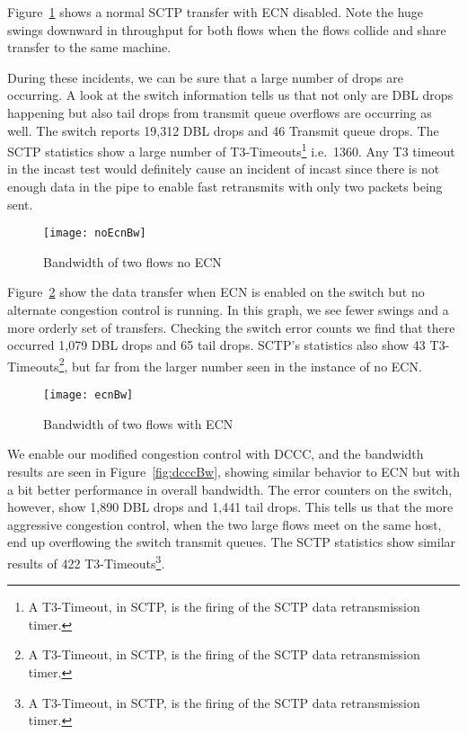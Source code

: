 \documentclass[12pt]{article}
\begin{document}
Figure~\ref{fig:noEcnBw} shows a normal SCTP transfer with
ECN disabled. Note the huge swings downward in throughput for both
flows when the flows collide and share transfer to the same machine. 

During these incidents, we can be sure that a large number of drops are occurring. A look at the switch
information tells us that not only are DBL drops happening but also tail
drops from transmit queue overflows are occurring as well.  The switch reports 19,312 DBL drops
and 46 Transmit queue drops. The SCTP statistics show
a large number of T3-Timeouts\footnote{A T3-Timeout, in SCTP, is the firing of the SCTP data retransmission timer.}
 i.e.~1360. Any T3 timeout in the incast test would definitely
cause an incident of incast since there is not enough data in the pipe to enable fast retransmits with
only two packets being sent.

\begin{figure}[!h]
\centering
\texttt{[image: noEcnBw]}
\caption{Bandwidth of two flows no ECN}
\label{fig:noEcnBw}
\end{figure}



Figure~\ref{fig:ecnBw} show the data transfer when ECN is enabled on
the switch but no alternate congestion control is running. In this graph,
we see fewer swings and a more orderly set of transfers. Checking
the switch error counts we find that there occurred 1,079 DBL drops and 65 tail
drops. SCTP's statistics also show 43 T3-Timeouts\footnote{A T3-Timeout, in SCTP, is the firing of the SCTP data retransmission timer.},
but far from the larger number seen in the instance of no ECN.

\begin{figure}[!h]
\centering
\texttt{[image: ecnBw]}
\caption{Bandwidth of two flows with ECN}
\label{fig:ecnBw}
\end{figure}



We enable our modified congestion control with DCCC, and the bandwidth
results are seen in Figure~\ref{fig:dcccBw}, showing similar behavior to ECN but with a bit better performance in
overall bandwidth. The error counters on the switch, however,
show 1,890 DBL drops and 1,441 tail drops. This tells us that  the more aggressive congestion
control, when the two large flows meet on the same host, end up overflowing the switch
transmit queues. The SCTP statistics show similar results of 422 
T3-Timeouts\footnote{A T3-Timeout, in SCTP, is the firing of the SCTP data retransmission timer.}. 
\end{document}
